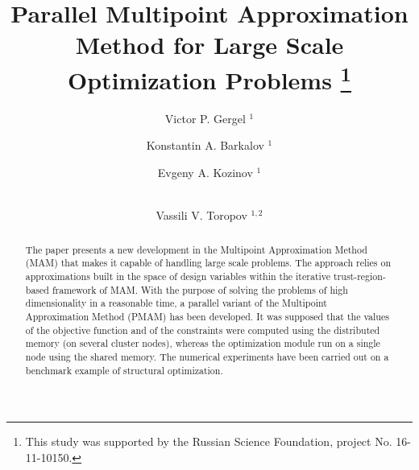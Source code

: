\documentclass[runningheads,a4paper]{llncs}
\begin{document}
\mainmatter  %

\title{Parallel Multipoint Approximation Method for Large Scale Optimization Problems 
\thanks{This study was supported by the Russian Science Foundation, project No. 16-11-10150.}}


\author{ Victor P. Gergel%
$^1$ \and
Konstantin A. Barkalov%
$^1$ \and
Evgeny A. Kozinov%
$^1$ \and \\
Vassili V. Toropov%
$^{1,2}$
}
%


%
%

\maketitle

\begin{abstract}
The paper presents a new development in the Multipoint Approximation Method (MAM) that makes it capable of handling large scale problems. The approach relies on approximations built in the space of design variables within the iterative trust-region-based framework of MAM. 
With the purpose of solving the problems of high dimensionality in a reasonable time, a parallel variant of the Multipoint Approximation Method (PMAM) has been developed. It was supposed that the values of the objective function and of the constraints were computed using the distributed memory (on several cluster nodes), whereas the optimization module run on a single node using the shared memory. The numerical experiments have been carried out on a benchmark example of structural optimization.

\end{abstract}
\end{document}
